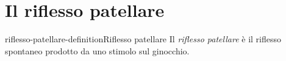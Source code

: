 \documentclass[preview]{standalone}
\begin{document}
\genpage

\section{Il riflesso patellare}

\begin{snippetdefinition}{riflesso-patellare-definition}{Riflesso patellare}
    Il \textit{riflesso patellare} è il riflesso spontaneo prodotto
    da uno stimolo sul ginocchio.
\end{snippetdefinition}

\end{document}
